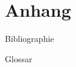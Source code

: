 \section{Anhang}
\label{sec:appendix}

\begin{frame}{Bibliographie}
    \printbibliography
\end{frame}

\begin{frame}{Glossar}
    \printglossary[type=main,title={Glossar},toctitle={Glossar}]
\end{frame}